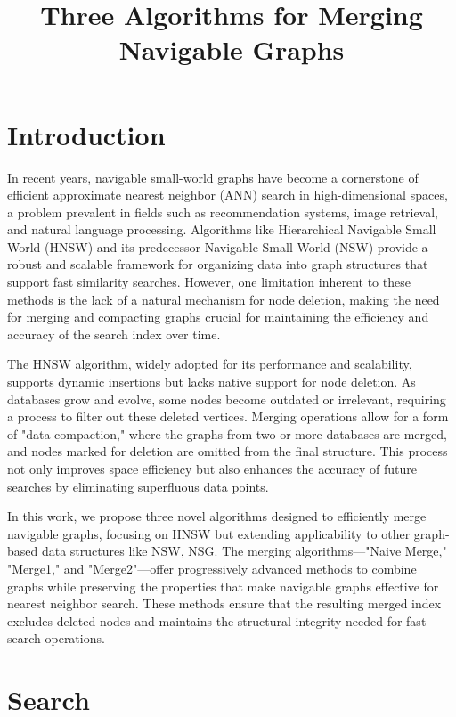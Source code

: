 \documentclass{article}
\title{Three Algorithms for Merging Navigable Graphs}
\author{}
\date{}
\begin{document}
\maketitle

\section{Introduction}
In recent years, navigable small-world graphs have become a cornerstone of efficient approximate nearest neighbor (ANN) search in high-dimensional spaces, a problem prevalent in fields such as recommendation systems, image retrieval, and natural language processing. Algorithms like Hierarchical Navigable Small World (HNSW) and its predecessor Navigable Small World (NSW) provide a robust and scalable framework for organizing data into graph structures that support fast similarity searches. However, one limitation inherent to these methods is the lack of a natural mechanism for node deletion, making the need for merging and compacting graphs crucial for maintaining the efficiency and accuracy of the search index over time.

The HNSW algorithm, widely adopted for its performance and scalability, supports dynamic insertions but lacks native support for node deletion. As databases grow and evolve, some nodes become outdated or irrelevant, requiring a process to filter out these deleted vertices. Merging operations allow for a form of "data compaction," where the graphs from two or more databases are merged, and nodes marked for deletion are omitted from the final structure. This process not only improves space efficiency but also enhances the accuracy of future searches by eliminating superfluous data points.

In this work, we propose three novel algorithms designed to efficiently merge navigable graphs, focusing on HNSW but extending applicability to other graph-based data structures like NSW, NSG. The merging algorithms—"Naive Merge," "Merge1," and "Merge2"—offer progressively advanced methods to combine graphs while preserving the properties that make navigable graphs effective for nearest neighbor search. These methods ensure that the resulting merged index excludes deleted nodes and maintains the structural integrity needed for fast search operations.

\section {Search}
\end{document}
